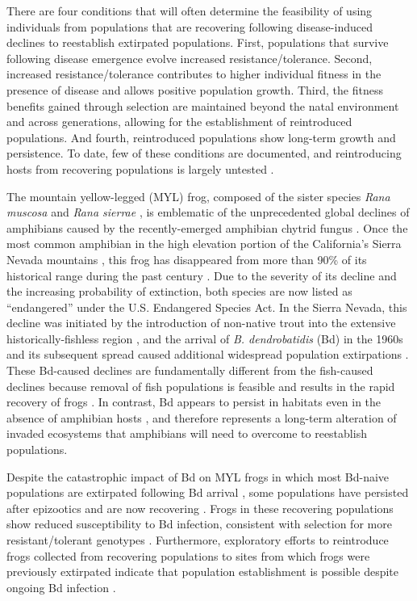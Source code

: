 \documentclass[9pt,twocolumn,twoside,lineno]{pnas-new}
\begin{document}
There are four conditions that will often determine the feasibility of
using individuals from populations that are recovering following
disease-induced declines to reestablish extirpated populations. First,
populations that survive following disease emergence evolve increased
resistance/tolerance. Second, increased resistance/tolerance contributes
to higher individual fitness in the presence of disease and allows
positive population growth. Third, the fitness benefits gained through
selection are maintained beyond the natal environment and across
generations, allowing for the establishment of reintroduced populations.
And fourth, reintroduced populations show long-term growth and
persistence. To date, few of these conditions are documented, and
reintroducing hosts from recovering populations is largely untested
\citep{scheele2021, mendelson2019}.

The mountain yellow-legged (MYL) frog, composed of the sister species
\emph{Rana muscosa} and \emph{Rana sierrae} \citep{vredenburg2007}, is
emblematic of the unprecedented global declines of amphibians caused by
the recently-emerged amphibian chytrid fungus
\citep[\emph{Batrachochytrium dendrobatidis,}][]{scheele2019}. Once the
most common amphibian in the high elevation portion of the California's
Sierra Nevada mountains \citep[USA,][]{grinnell1924}, this frog has
disappeared from more than 90\% of its historical range during the past
century \citep{vredenburg2007}. Due to the severity of its decline and
the increasing probability of extinction, both species are now listed as
``endangered'' under the U.S. Endangered Species Act. In the Sierra
Nevada, this decline was initiated by the introduction of non-native
trout into the extensive historically-fishless region
\citep{bradford1989, knapp2000}, and the arrival of \emph{B.
dendrobatidis} (Bd) in the 1960s and its subsequent spread
\citep{vredenburg2019} caused additional widespread population
extirpations \citep{vredenburg2010, rachowicz2006}. These Bd-caused
declines are fundamentally different from the fish-caused declines
because removal of fish populations is feasible and results in the rapid
recovery of frogs \citep{knapp2007, vredenburg2004}. In contrast, Bd
appears to persist in habitats even in the absence of amphibian hosts
\citep{walker2007}, and therefore represents a long-term alteration of
invaded ecosystems that amphibians will need to overcome to reestablish
populations.

Despite the catastrophic impact of Bd on MYL frogs in which most
Bd-naive populations are extirpated following Bd arrival
\citep{vredenburg2010}, some populations have persisted after epizootics
\citep{briggs2010} and are now recovering \citep{knapp2016}. Frogs in
these recovering populations show reduced susceptibility to Bd
infection, consistent with selection for more resistant/tolerant
genotypes \citep{knapp2016}. Furthermore, exploratory efforts to
reintroduce frogs collected from recovering populations to sites from
which frogs were previously extirpated indicate that population
establishment is possible despite ongoing Bd infection
\citep{joseph2018}.
\end{document}
